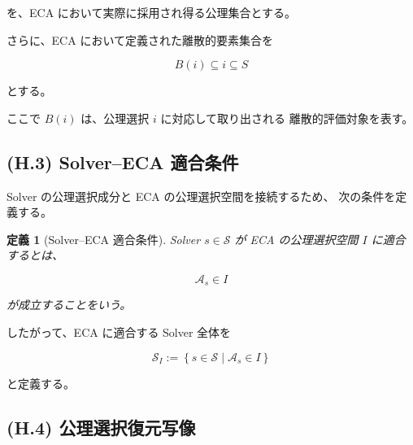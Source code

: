 \documentclass[a4paper,11pt]{article}
\newtheorem{definition}{定義}[section]
\begin{document}
を、ECA において実際に採用され得る公理集合とする。

さらに、ECA において定義された離散的要素集合を

\begin{equation}
    B(i)
    \subseteq
    i
    \subseteq
    S
    \label{eq:H-discrete-subset}
\end{equation}

とする。

ここで $B(i)$ は、公理選択 $i$ に対応して取り出される
離散的評価対象を表す。


\subsection{(H.3) Solver--ECA 適合条件}
\label{subsec:H3}

Solver の公理選択成分と ECA の公理選択空間を接続するため、
次の条件を定義する。

\begin{definition}[Solver--ECA 適合条件]
\label{def:H-compatible}
Solver $s\in\mathcal{S}$ が ECA の公理選択空間 $I$ に適合するとは、

\begin{equation}
    \boxed{
        \mathcal{A}_s\in I
    }
    \label{eq:H-compatible}
\end{equation}

が成立することをいう。
\end{definition}

したがって、ECA に適合する Solver 全体を

\begin{equation}
    \boxed{
        \mathcal{S}_I
        :=
        \left\{
            s\in\mathcal{S}
            \mid
            \mathcal{A}_s\in I
        \right\}
    }
    \label{eq:H-compatible-solvers}
\end{equation}

と定義する。


\subsection{(H.4) 公理選択復元写像}
\label{subsec:H4}
\end{document}
